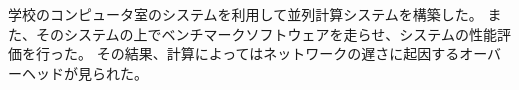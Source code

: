 \def \wrkdir {p.ngk/}

 \label{pa:ngk}
学校のコンピュータ室のシステムを利用して並列計算システムを構築した。
また、そのシステムの上でベンチマークソフトウェアを走らせ、システムの性能評価を行った。
その結果、計算によってはネットワークの遅さに起因するオーバーヘッドが見られた。
